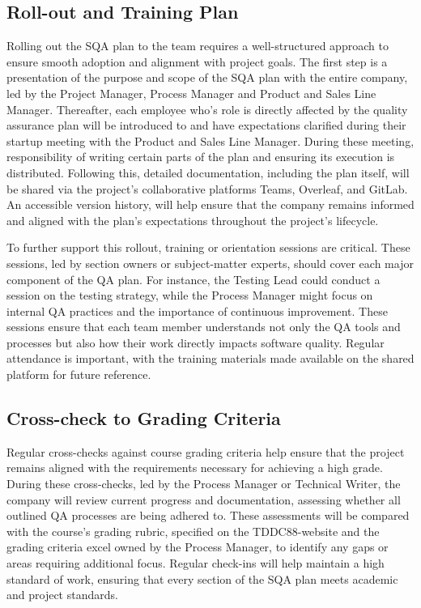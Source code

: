 \documentclass{article}
\begin{document}
\subsection{Roll-out and Training Plan}
Rolling out the SQA plan to the team requires a well-structured approach to ensure smooth adoption and alignment with project goals. The first step is a presentation of the purpose and scope of the SQA plan with the entire company, led by the Project Manager, Process Manager and Product and Sales Line Manager. Thereafter, each employee who's role is directly affected by the quality assurance plan will be introduced to and have expectations clarified during their startup meeting with the Product and Sales Line Manager. During these meeting, responsibility of writing certain parts of the plan and ensuring its execution is distributed. Following this, detailed documentation, including the plan itself, will be shared via the project's collaborative platforms Teams, Overleaf, and GitLab. An accessible version history, will help ensure that the company remains informed and aligned with the plan's expectations throughout the project's lifecycle.

To further support this rollout, training or orientation sessions are critical. These sessions, led by section owners or subject-matter experts, should cover each major component of the QA plan. For instance, the Testing Lead could conduct a session on the testing strategy, while the Process Manager might focus on internal QA practices and the importance of continuous improvement. These sessions ensure that each team member understands not only the QA tools and processes but also how their work directly impacts software quality. Regular attendance is important, with the training materials made available on the shared platform for future reference.

\subsection{Cross-check to Grading Criteria}
Regular cross-checks against course grading criteria help ensure that the project remains aligned with the requirements necessary for achieving a high grade. During these cross-checks, led by the Process Manager or Technical Writer, the company will review current progress and documentation, assessing whether all outlined QA processes are being adhered to. These assessments will be compared with the course's grading rubric, specified on the TDDC88-website and the grading criteria excel owned by the Process Manager, to identify any gaps or areas requiring additional focus. Regular check-ins will help maintain a high standard of work, ensuring that every section of the SQA plan meets academic and project standards.
\end{document}
